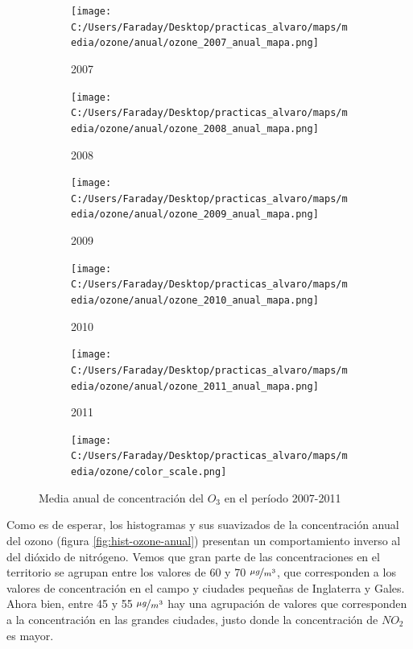 \documentclass[12pt]{article}
\begin{document}
\begin{figure}[H]
\centering
\begin{subfigure}[H]{0.18\textwidth}
\texttt{[image: C:/Users/Faraday/Desktop/practicas\_alvaro/maps/media/ozone/anual/ozone\_2007\_anual\_mapa.png]}
\captionsetup{labelformat=empty}
\caption{2007}
\end{subfigure}
%
\begin{subfigure}[H]{0.18\textwidth}
\texttt{[image: C:/Users/Faraday/Desktop/practicas\_alvaro/maps/media/ozone/anual/ozone\_2008\_anual\_mapa.png]}
\captionsetup{labelformat=empty}
\caption{2008}
\end{subfigure}
%
\begin{subfigure}[H]{0.18\textwidth}
\texttt{[image: C:/Users/Faraday/Desktop/practicas\_alvaro/maps/media/ozone/anual/ozone\_2009\_anual\_mapa.png]}
\captionsetup{labelformat=empty}
\caption{2009}
\end{subfigure}
%
\begin{subfigure}[H]{0.18\textwidth}
\texttt{[image: C:/Users/Faraday/Desktop/practicas\_alvaro/maps/media/ozone/anual/ozone\_2010\_anual\_mapa.png]}
\captionsetup{labelformat=empty}
\caption{2010}
\end{subfigure}
%
\begin{subfigure}[H]{0.18\textwidth}
\texttt{[image: C:/Users/Faraday/Desktop/practicas\_alvaro/maps/media/ozone/anual/ozone\_2011\_anual\_mapa.png]}
\captionsetup{labelformat=empty}
\caption{2011}
\end{subfigure}

\begin{subfigure}[H]{0.45\textwidth}
\texttt{[image: C:/Users/Faraday/Desktop/practicas\_alvaro/maps/media/ozone/color\_scale.png]}
\captionsetup{labelformat=empty}
\caption{}
\end{subfigure}

\vspace*{-7mm}
\caption{Media anual de concentración del $O_{3}$ en el período 2007-2011}
\label{fig:map-ozone-anual}
\end{figure}

Como es de esperar, los histogramas y sus suavizados de la concentración anual del ozono (figura \ref{fig:hist-ozone-anual}) presentan un comportamiento inverso al del dióxido de nitrógeno. Vemos que gran parte de las concentraciones en el territorio se agrupan entre los valores de 60 y 70 $\nicefrac{\mu g}{m^{3}}$, que corresponden a los valores de concentración en el campo y ciudades pequeñas de Inglaterra y Gales. Ahora bien, entre 45 y 55 $\nicefrac{\mu g}{m^{3}}$ hay una agrupación de valores que corresponden a la concentración en las grandes ciudades, justo donde la concentración de $NO_{2}$ es mayor.
\end{document}

